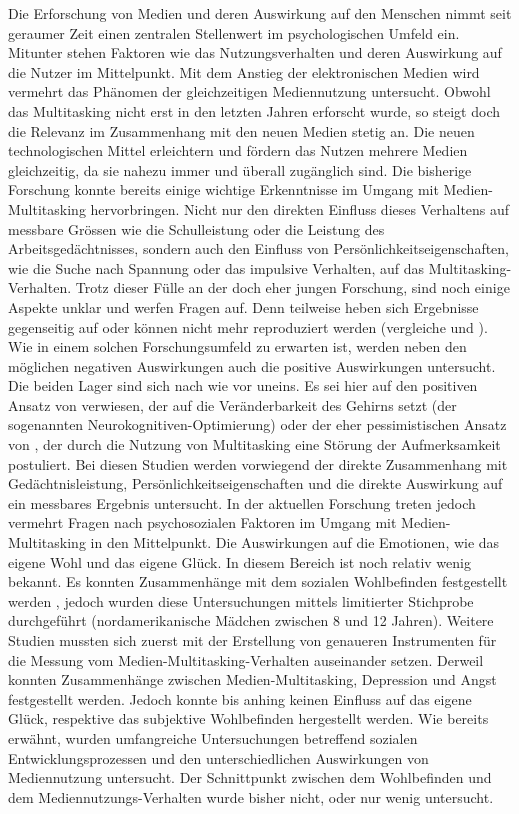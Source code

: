\label{section.fazitLücke}
Die Erforschung von Medien und deren Auswirkung auf den Menschen nimmt seit geraumer Zeit einen zentralen Stellenwert im psychologischen Umfeld ein. Mitunter stehen Faktoren wie das Nutzungsverhalten und deren Auswirkung auf die Nutzer im Mittelpunkt. Mit dem Anstieg der elektronischen Medien wird vermehrt das Phänomen der gleichzeitigen Mediennutzung untersucht. Obwohl das Multitasking nicht erst in den letzten Jahren erforscht wurde, so steigt doch die Relevanz im Zusammenhang mit den neuen Medien stetig an. Die neuen technologischen Mittel erleichtern und fördern das Nutzen mehrere Medien gleichzeitig, da sie nahezu immer und überall zugänglich sind. Die bisherige Forschung konnte bereits einige wichtige Erkenntnisse im Umgang mit Medien-Multitasking hervorbringen. Nicht nur den direkten Einfluss dieses Verhaltens auf messbare Grössen wie die Schulleistung oder die Leistung des Arbeitsgedächtnisses, sondern auch den Einfluss von Persönlichkeitseigenschaften, wie die Suche nach Spannung oder das impulsive Verhalten, auf das Multitasking-Verhalten. Trotz dieser Fülle an der doch eher jungen Forschung, sind noch einige Aspekte unklar und werfen Fragen auf. Denn teilweise heben sich Ergebnisse gegenseitig auf oder können nicht mehr reproduziert werden (vergleiche  und ). Wie in einem solchen Forschungsumfeld zu erwarten ist, werden neben den möglichen negativen Auswirkungen auch die positive Auswirkungen untersucht. Die beiden Lager sind sich nach wie vor uneins. Es sei hier auf den positiven Ansatz von  verwiesen, der auf die Veränderbarkeit des Gehirns setzt (der sogenannten Neurokognitiven-Optimierung) oder der eher pessimistischen Ansatz von , der durch die Nutzung von Multitasking eine Störung der Aufmerksamkeit postuliert. Bei diesen Studien werden vorwiegend der direkte Zusammenhang mit Gedächtnisleistung, Persönlichkeitseigenschaften und die direkte Auswirkung auf ein messbares Ergebnis untersucht. In der aktuellen Forschung treten jedoch vermehrt Fragen nach psychosozialen Faktoren im Umgang mit Medien-Multitasking in den Mittelpunkt. Die Auswirkungen auf die Emotionen, wie das eigene Wohl und das eigene Glück. In diesem Bereich ist noch relativ wenig bekannt. Es konnten Zusammenhänge mit dem sozialen Wohlbefinden festgestellt werden , jedoch wurden diese Untersuchungen mittels limitierter Stichprobe durchgeführt (nordamerikanische Mädchen zwischen 8 und 12 Jahren). Weitere Studien mussten sich zuerst mit der Erstellung von genaueren Instrumenten für die Messung vom Medien-Multitasking-Verhalten auseinander setzen. Derweil konnten Zusammenhänge zwischen Medien-Multitasking, Depression und Angst festgestellt werden. Jedoch konnte bis anhing keinen  Einfluss auf das eigene Glück, respektive das subjektive Wohlbefinden hergestellt werden. Wie bereits  erwähnt, wurden umfangreiche Untersuchungen betreffend sozialen Entwicklungsprozessen und den unterschiedlichen Auswirkungen von Mediennutzung untersucht. Der Schnittpunkt zwischen dem Wohlbefinden und dem Mediennutzungs-Verhalten wurde bisher nicht, oder nur wenig untersucht. 
